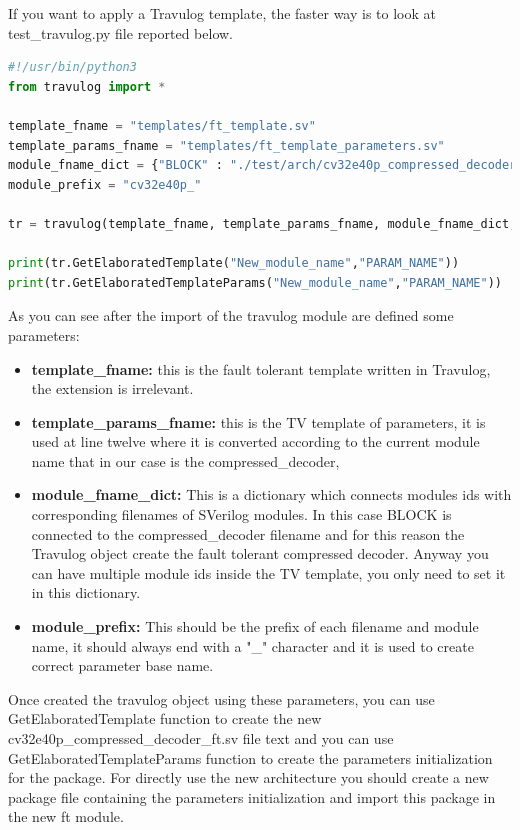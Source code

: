 {{{            If you want to apply a Travulog template, the faster way is to look at test\_travulog.py file reported below.
            \begin{lstlisting}[basicstyle=\ttfamily\scriptsize, language=Python, caption=Basic Python code to use Travulog, label=lst:texttravulog]
#!/usr/bin/python3
from travulog import *

template_fname = "templates/ft_template.sv"
template_params_fname = "templates/ft_template_parameters.sv"
module_fname_dict = {"BLOCK" : "./test/arch/cv32e40p_compressed_decoder.sv"}
module_prefix = "cv32e40p_"

tr = travulog(template_fname, template_params_fname, module_fname_dict, module_prefix)

print(tr.GetElaboratedTemplate("New_module_name","PARAM_NAME"))
print(tr.GetElaboratedTemplateParams("New_module_name","PARAM_NAME"))
            \end{lstlisting}
            
            As you can see after the import of the travulog module are defined some parameters: 
            \begin{itemize}
                \item \textbf{template\_fname:} this is the fault tolerant template written in Travulog, the extension is irrelevant.
                \item \textbf{template\_params\_fname:} this is the TV template of parameters, it is used at line twelve where it is converted according to the current module name that in our case is the compressed\_decoder,
                \item \textbf{module\_fname\_dict:} This is a dictionary which connects modules ids with corresponding filenames of SVerilog modules. In this case BLOCK is connected to the compressed\_decoder filename and for this reason the Travulog object create the fault tolerant compressed decoder. Anyway you can have multiple module ids inside the TV template, you only need to set it in this dictionary.
                \item \textbf{module\_prefix:} This should be the prefix of each filename and module name, it should always end with a  "\_" character and it is used to create correct parameter base name.
            \end{itemize} 
            
            Once created the travulog object using these parameters, you can use GetElaboratedTemplate function to create the new cv32e40p\_compressed\_decoder\_ft.sv file text and you can use GetElaboratedTemplateParams function to create the parameters initialization for the package.
            For directly use the new architecture you should create a new package file containing the parameters initialization and import this package in the new ft module.
        
}}}
